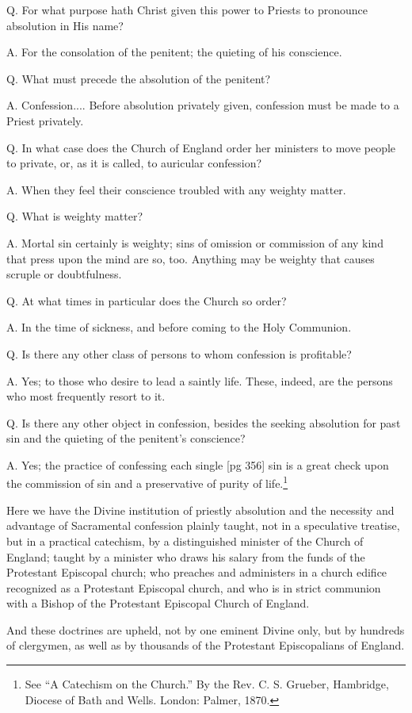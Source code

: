 Q. For what purpose hath Christ given this
power to Priests to pronounce absolution in His
name?

A. For the consolation of the penitent; the
quieting of his conscience.

Q. What must precede the absolution of the
penitent?

A. Confession.... Before absolution
privately given, confession must be made to a Priest
privately.

Q. In what case does the Church of England
order her ministers to move people to private, or,
as it is called, to auricular confession?

A. When they feel their conscience troubled
with any weighty matter.

Q. What is weighty matter?

A. Mortal sin certainly is weighty; sins of
omission or commission of any kind that press
upon the mind are so, too. Anything may be
weighty that causes scruple or doubtfulness.

Q. At what times in particular does the Church
so order?

A. In the time of sickness, and before coming
to the Holy Communion.

Q. Is there any other class of persons to whom
confession is profitable?

A. Yes; to those who desire to lead a saintly
life. These, indeed, are the persons who most frequently
resort to it.

Q. Is there any other object in confession, besides
the seeking absolution for past sin and the
quieting of the penitent's conscience?

A. Yes; the practice of confessing each single
[pg 356]
sin is a great check upon the commission of sin
and a preservative of purity of life.\footnote{See
“A Catechism on the Church.” By the Rev. C. S.
Grueber, Hambridge, Diocese of Bath and Wells. London:
Palmer, 1870.}

Here we have the Divine institution of priestly
absolution and the necessity and advantage of
Sacramental confession plainly taught, not in a
speculative treatise, but in a practical catechism,
by a distinguished minister of the Church of England;
taught by a minister who draws his salary
from the funds of the Protestant Episcopal
church; who preaches and administers in a church
edifice recognized as a Protestant Episcopal
church, and who is in strict communion with a
Bishop of the Protestant Episcopal Church of
England.

And these doctrines are upheld, not by one eminent
Divine only, but by hundreds of clergymen, as
well as by thousands of the Protestant Episcopalians
of England.

